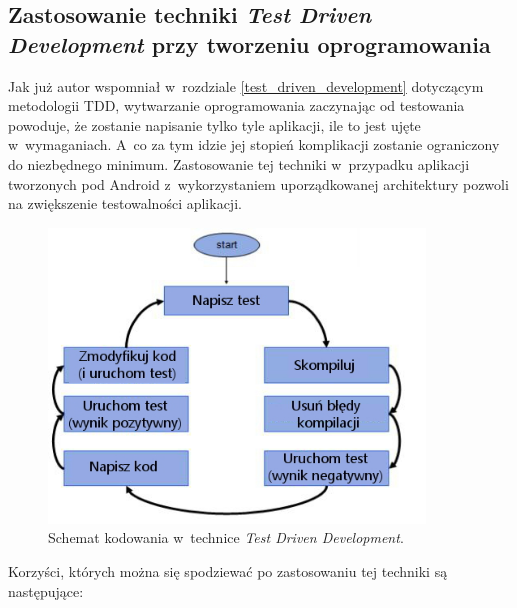 \subsection{Zastosowanie techniki \textit{Test Driven Development} \newline przy tworzeniu oprogramowania}
\label{wybor_tdd}
Jak już autor wspomniał w~rozdziale \ref{test_driven_development} dotyczącym metodologii TDD, wytwarzanie oprogramowania zaczynając od testowania powoduje, że zostanie napisanie tylko tyle aplikacji, ile to jest ujęte w~wymaganiach. A~co za tym idzie jej stopień komplikacji zostanie ograniczony do niezbędnego minimum. Zastosowanie tej techniki w~przypadku aplikacji tworzonych pod Android z~wykorzystaniem uporządkowanej architektury pozwoli na zwiększenie testowalności aplikacji. 

\begin{figure}[!htb]
    \centering
    \includegraphics[width=10cm]{imgs/ch4_tdd_pl.jpg}
    \caption
{Schemat kodowania w~technice \textit{Test Driven Development}.}
    \label{fig:tdd_schema}
\end{figure} 

Korzyści, których można się spodziewać po zastosowaniu tej techniki są następujące:

